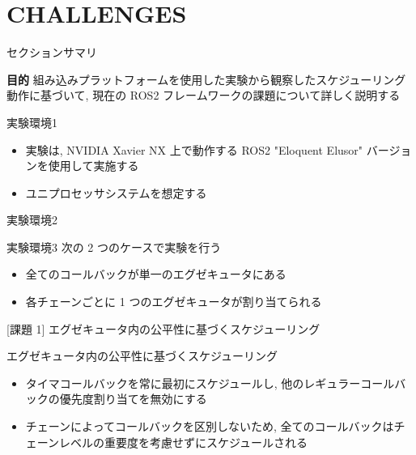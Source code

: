 
\section{CHALLENGES}
\label{sec: challenges}

\begin{frame}{セクションサマリ}
    \begin{itembox}[l]{\textbf{目的}}
        組み込みプラットフォームを使用した実験から観察したスケジューリング動作に基づいて, 現在の ROS2 フレームワークの課題について詳しく説明する
    \end{itembox}
\end{frame}

\begin{frame}{実験環境1}
    \begin{itemize}
        \item 実験は, NVIDIA Xavier NX 上で動作する ROS2 "Eloquent Elusor" バージョンを使用して実施する
        \item ユニプロセッサシステムを想定する
    \end{itemize}
\end{frame}

\begin{frame}[label=exampleChain]{実験環境2}
\end{frame}

\begin{frame}{実験環境3}
    次の 2 つのケースで実験を行う
    \begin{itemize}
        \item 全てのコールバックが単一のエグゼキュータにある
        \item 各チェーンごとに 1 つのエグゼキュータが割り当てられる
    \end{itemize}
\end{frame}

\begin{frame}{[課題 1] エグゼキュータ内の公平性に基づくスケジューリング}
    \begin{block}{エグゼキュータ内の公平性に基づくスケジューリング}
      \setlength{\linewidth}{0.98\columnwidth}
      \begin{itemize}
        \item タイマコールバックを常に最初にスケジュールし, 他のレギュラーコールバックの優先度割り当てを無効にする
        \item チェーンによってコールバックを区別しないため, 全てのコールバックはチェーンレベルの重要度を考慮せずにスケジュールされる
      \end{itemize}
    \end{block}
\end{frame}

